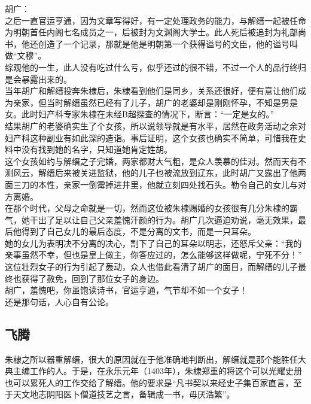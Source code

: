 \begin{multicols}{\theparacolNo}
胡广：\\

之后一直官运亨通，因为文章写得好，有一定处理政务的能力，与解缙一起被任命为明朝首任内阁七名成员之一，后被封为文渊阁大学士。此人死后被追封为礼部尚书，他还创造了一个记录，那就是他是明朝第一个获得谥号的文臣，他的谥号叫做“文穆”。\\

综观他的一生，此人没有吃过什么亏，似乎还过的很不错，不过一个人的品行终归是会暴露出来的。\\

当年胡广和解缙投奔朱棣后，朱棣看到他们是同乡，关系还很好，便有意让他们成为亲家，但当时解缙虽然已经有了儿子，胡广的老婆却是刚刚怀孕，不知是男是女。此时妇产科专家朱棣在未经B超探查的情况下，断言：“一定是女的。”\\

结果胡广的老婆确实生了个女孩，所以说领导就是有水平，居然在政务活动之余对妇产科这种副业有如此深的造诣。事后证明，这个女孩也确实不简单，可惜我在史料中没有找到她的名字，只知道她肯定姓胡。\\

这个女孩如约与解缙之子完婚，两家都财大气粗，是众人羡慕的佳对。然而天有不测风云，解缙后来被关进监狱，他的儿子也被流放到辽东，此时胡广又露出了他两面三刀的本性，亲家一倒霉掉进井里，他就立刻四处找石头。勒令自己的女儿与对方离婚。\\

在那个时代，父母之命就是一切，然而这位被朱棣赐婚的女孩很有几分朱棣的霸气，她干出了足以让自己父亲羞愧汗颜的行为。胡广几次逼迫劝说，毫无效果，最后他得到了自己女儿的最后态度，不是分离的文书，而是一只耳朵。\\

她的女儿为表明决不分离的决心，割下了自己的耳朵以明志，还怒斥父亲：“我的亲事虽然不幸，但也是皇上做主，你答应过的，怎么能够这样做呢，宁死不分！”\\

这位壮烈女子的行为引起了轰动，众人也借此看清了胡广的面目，而解缙的儿子最终也获得了赦免，回到了那位女子的身边。\\

胡广，羞愧吧，你虽饱读诗书，官运亨通，气节却不如一个女子！\\

还是那句话，人心自有公论。\\

\subsection{飞腾}
朱棣之所以器重解缙，很大的原因就在于他准确地判断出，解缙就是那个能胜任大典主编工作的人。于是，在永乐元年（1403年），朱棣郑重的将这个可以光耀史册也可以累死人的工作交给了解缙。他的要求是“凡书契以来经史子集百家直言，至于天文地志阴阳医卜僧道技艺之言，备辑成一书，毋厌浩繁”。\\


\end{multicols}
